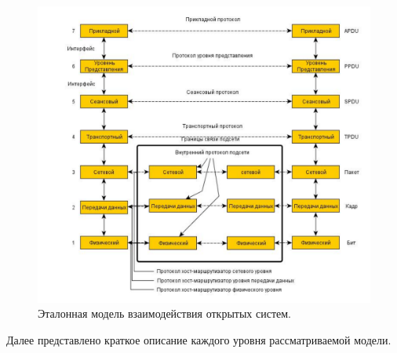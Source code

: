 \documentclass[12pt]{report}
\begin{document}
    \begin{figure}[H]\center
        \includegraphics[width = 140mm]{Ch2Pic2}
        \caption{Эталонная модель взаимодействия открытых систем.} \label{Pic2}
    \end{figure}

    Далее представлено краткое описание каждого уровня рассматриваемой модели.
\end{document}
